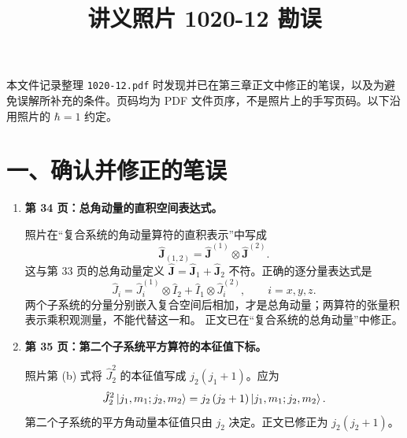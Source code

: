 \documentclass[UTF8,12pt,a4paper,fontset=fandol]{ctexart}
\title{讲义照片 1020-12 勘误}
\author{}
\date{}
\begin{document}
\maketitle

本文件记录整理 \texttt{1020-12.pdf} 时发现并已在第三章正文中修正的笔误，以及为避免误解所补充的条件。页码均为 PDF 文件页序，不是照片上的手写页码。以下沿用照片的 $\hbar=1$ 约定。

\section*{一、确认并修正的笔误}
\begin{enumerate}
\item \textbf{第 34 页：总角动量的直积空间表达式。}

照片在“复合系统的角动量算符的直积表示”中写成
\begin{equation}
\hat{\bm J}_{\left(1,2\right)}
=\hat{\bm J}^{\left(1\right)}\otimes\hat{\bm J}^{\left(2\right)}.
\end{equation}
这与第 33 页的总角动量定义 $\hat{\bm J}=\hat{\bm J}_1+\hat{\bm J}_2$ 不符。正确的逐分量表达式是
\begin{equation}
\boxed{\hat J_i=\hat J_i^{\left(1\right)}\otimes\hat I_2
+\hat I_1\otimes\hat J_i^{\left(2\right)},\qquad i=x,y,z.}
\end{equation}
两个子系统的分量分别嵌入复合空间后相加，才是总角动量；两算符的张量积表示乘积观测量，不能代替这一和。
正文已在“复合系统的总角动量”中修正。

\item \textbf{第 35 页：第二个子系统平方算符的本征值下标。}

照片第 \textup{(b)} 式将 $\hat J_2^2$ 的本征值写成 $j_2\left(j_1+1\right)$。应为
\begin{equation}
\hat J_2^2\Ket{j_1,m_1;j_2,m_2}
=j_2\left(j_2+1\right)\Ket{j_1,m_1;j_2,m_2}.
\end{equation}
第二个子系统的平方角动量本征值只由 $j_2$ 决定。正文已修正为 $j_2\left(j_2+1\right)$。
\end{enumerate}
\end{document}
